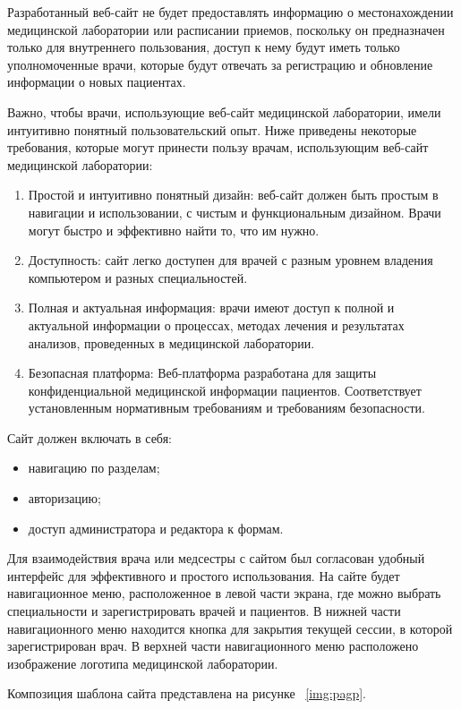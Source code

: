 Разработанный веб-сайт не будет предоставлять информацию о местонахождении медицинской лаборатории или расписании приемов, поскольку он предназначен только для внутреннего пользования, доступ к нему будут иметь только уполномоченные врачи, которые будут отвечать за регистрацию и обновление информации о новых пациентах.

Важно, чтобы врачи, использующие веб-сайт медицинской лаборатории, имели интуитивно понятный пользовательский опыт. Ниже приведены некоторые требования, которые могут принести пользу врачам, использующим веб-сайт медицинской лаборатории:

\begin{enumerate}
	\item Простой и интуитивно понятный дизайн: веб-сайт должен быть простым в навигации и использовании, с чистым и функциональным дизайном. Врачи могут быстро и эффективно найти то, что им нужно.
	\item Доступность: сайт легко доступен для врачей с разным уровнем владения компьютером и разных специальностей.
	\item Полная и актуальная информация: врачи имеют доступ к полной и актуальной информации о процессах, методах лечения и результатах анализов, проведенных в медицинской лаборатории.
	\item Безопасная платформа: Веб-платформа разработана для защиты конфиденциальной медицинской информации пациентов. Соответствует установленным нормативным требованиям и требованиям безопасности.
\end{enumerate}

Сайт должен включать в себя:
\begin{itemize}
    \item навигацию по разделам;
    \item авторизацию;
    \item доступ администратора и редактора к формам.
\end{itemize}

Для взаимодействия врача или медсестры с сайтом был согласован удобный интерфейс для эффективного и простого использования. На сайте будет навигационное меню, расположенное в левой части экрана, где можно выбрать специальности и зарегистрировать врачей и пациентов. В нижней части навигационного меню находится кнопка для закрытия текущей сессии, в которой зарегистрирован врач. В верхней части навигационного меню расположено изображение логотипа медицинской лаборатории.

Композиция шаблона сайта представлена на рисунке ~\ref{img:pagp}.

